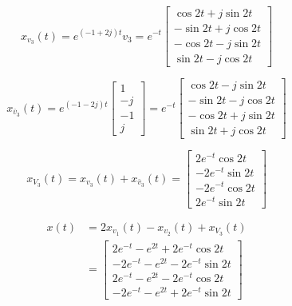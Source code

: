 \documentclass[12pt,a4paper]{article}
\begin{document}
\[
x_{v_3}(t) = e^{(-1 + 2j)t} v_3 = e^{-t}\begin{bmatrix}
	\cos 2 t + j\sin 2 t \\
	-\sin 2 t + j\cos 2 t \\
	-\cos 2  t - j\sin 2 t \\
	\sin 2 t - j\cos 2  t
\end{bmatrix}
\]

\[
x_{\bar v_3 }(t) = e^{(-1 - 2j)t} \begin{bmatrix}
	1 \\ -j \\ -1 \\ j
\end{bmatrix} = e^{-t} \begin{bmatrix}
\cos 2 t - j\sin 2 t \\
-\sin 2  t - j\cos2 t \\
-\cos 2  t + j\sin 2 t \\
\sin 2 t + j\cos 2 t
\end{bmatrix}
\]

\[
x_{V_3}(t) = x_{v_3}(t) + x_{\bar v_3}(t) = \begin{bmatrix}
	2e^{-t} \cos 2t \\
	-2e^{-t} \sin 2t \\
	-2e^{-t} \cos 2t \\
	2e^{-t} \sin 2t 
\end{bmatrix}
\]

\begin{align*}
	x(t) &= 2x_{v_1}(t) - x_{v_2}(t) + x_{V_3}(t) \\
	&= \begin{bmatrix}
		2e^{-t} -e^{2t} + 2e^{-t}\cos 2t \\
		-2e^{-t} -e^{2t} -2e^{-t}\sin 2t \\
		2e^{-t} - e^{2t} -2e^{-t} \cos 2t \\
		-2e^{-t} - e^{2t} + 2e^{-t} \sin 2t
	\end{bmatrix}
\end{align*}



\vspace{4cm}
\clearpage
\end{document}
